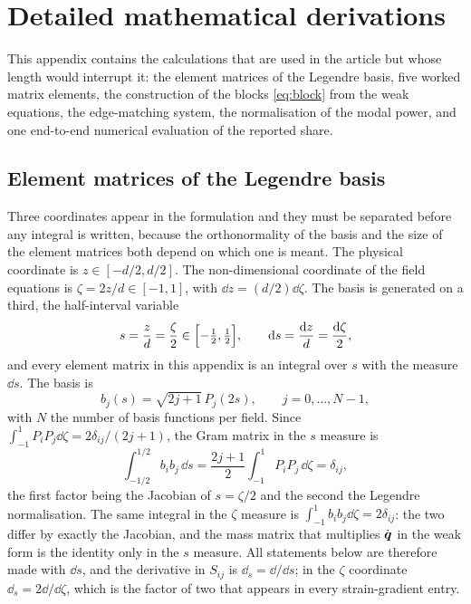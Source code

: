 \section{Detailed mathematical derivations}
\label{app:derivations}

This appendix contains the calculations that are used in the article but whose
length would interrupt it: the element matrices of the Legendre basis, five
worked matrix elements, the construction of the blocks \eqref{eq:block} from the
weak equations, the edge-matching system, the normalisation of the modal power,
and one end-to-end numerical evaluation of the reported share.

\subsection{Element matrices of the Legendre basis}

Three coordinates appear in the formulation and they must be separated before
any integral is written, because the orthonormality of the basis and the size of
the element matrices both depend on which one is meant.  The physical coordinate
is $z\in[-d/2,d/2]$.  The non-dimensional coordinate of the field equations is
$\zeta=2z/d\in[-1,1]$, with $\dd z=(d/2)\dd\zeta$.  The basis is generated on a
third, the half-interval variable
\begin{equation}
\label{eq:app_measures}
s=\frac{z}{d}=\frac{\zeta}{2}\in\Bigl[-\tfrac12,\tfrac12\Bigr],
\qquad
\mathrm{d} s=\frac{\mathrm{d} z}{d}=\frac{\mathrm{d}\zeta}{2},
\end{equation}
and every element matrix in this appendix is an integral over $s$ with the
measure $\dd s$.  The basis is
\begin{equation}
\label{eq:app_basis}
b_j(s)=\sqrt{2j+1}\,P_j(2s),\qquad j=0,\dots,N-1,
\end{equation}
with $N$ the number of basis functions per field.  Since
$\int_{-1}^{1}P_iP_j\dd\zeta=2\delta_{ij}/(2j+1)$, the Gram matrix in the $s$
measure is
\begin{equation}
\label{eq:app_mass}
\int_{-1/2}^{1/2}b_ib_j\,\dd s
=\frac{2j+1}{2}\int_{-1}^{1}P_iP_j\,\dd\zeta=\delta_{ij},
\end{equation}
the first factor being the Jacobian of $s=\zeta/2$ and the second the Legendre
normalisation.  The same integral in the $\zeta$ measure is
$\int_{-1}^{1}b_ib_j\dd\zeta=2\delta_{ij}$: the two differ by exactly the
Jacobian, and the mass matrix that multiplies $\dot{\boldsymbol{q}}$ in the weak form is
the identity only in the $s$ measure.  All statements below are therefore made
with $\dd s$, and the derivative in $S_{ij}$ is $\dd_s=\dd/\dd s$; in the $\zeta$
coordinate $\dd_s=2\dd/\dd\zeta$, which is the factor of two that appears in
every strain-gradient entry.

